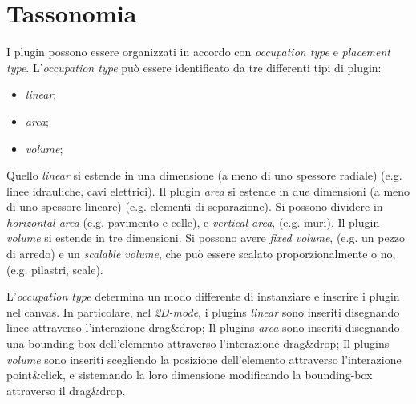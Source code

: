 \section{Tassonomia}
\label{sec:chapter_3_section_2}

\noindent
I plugin possono essere organizzati in accordo con \emph{occupation type} e \emph{placement type}.
L'\emph{occupation type} può essere identificato da tre differenti tipi di plugin:
\begin{itemize}
  \item \emph{linear};
  \item \emph{area};
  \item \emph{volume};
\end{itemize}
Quello \emph{linear} si estende in una dimensione (a meno di uno spessore radiale) (e.g. linee idrauliche, cavi elettrici).
Il plugin \emph{area} si estende in due dimensioni (a meno di uno spessore lineare) (e.g. elementi di separazione).
Si possono dividere in \emph{horizontal area} (e.g. pavimento e celle), e \emph{vertical area}, (e.g. muri).
Il plugin \emph{volume} si estende in tre dimensioni. Si possono avere \emph{fixed volume}, (e.g. un pezzo di arredo) e
un \emph{scalable volume}, che può essere scalato proporzionalmente o no, (e.g. pilastri, scale).


L'\emph{occupation type} determina un modo differente di instanziare e inserire i plugin nel canvas.
In particolare, nel \emph{2D-mode}, i plugins \emph{linear} sono inseriti disegnando linee attraverso l'interazione drag\&drop;
Il plugins \emph{area} sono inseriti disegnando una bounding-box dell'elemento attraverso l'interazione drag\&drop;
Il plugins \emph{volume} sono inseriti scegliendo la posizione dell'elemento attraverso l'interazione point\&click,
e sistemando la loro dimensione modificando la bounding-box attraverso il drag\&drop.

